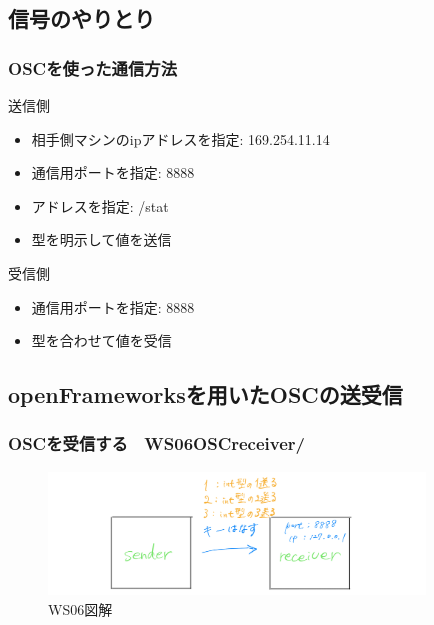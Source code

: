 \documentclass[10pt, dvipdfmx]{beamer}
\begin{document}
    \subsection{信号のやりとり}
        \begin{frame}
            \frametitle{OSCを使った通信方法}
            \begin{block}{送信側}
                \begin{itemize}
                    \item 相手側マシンのipアドレスを指定: 169.254.11.14
                    \item 通信用ポートを指定: 8888
                    \item アドレスを指定: /stat
                    \item 型を明示して値を送信
                \end{itemize}
            \end{block}
            \begin{block}{受信側}
                \begin{itemize}
                    \item 通信用ポートを指定: 8888
                    \item 型を合わせて値を受信
                \end{itemize}
            \end{block}
        \end{frame}

    \subsection{openFrameworksを用いたOSCの送受信}
        \begin{frame}
            \frametitle{OSCを受信する　WS06OSCreceiver/}
                \begin{figure}[htb]
                    \includegraphics[width=100mm]{images/ws06-1.png}
                    \caption{WS06図解}
                    \label{fig:03}
                \end{figure}
        \end{frame}
\end{document}
